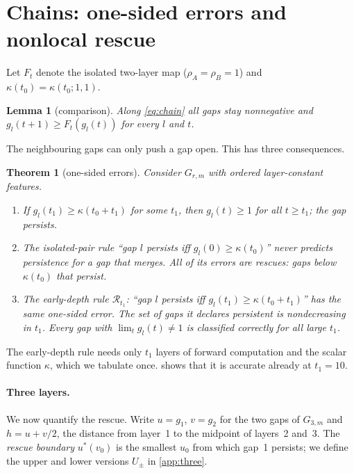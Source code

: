 \documentclass[10pt]{article}
\newtheorem{theorem}{Theorem}
\newtheorem{lemma}{Lemma}
\theoremstyle{definition}
\theoremstyle{remark}
\begin{document}
\section{Chains: one-sided errors and nonlocal rescue}\label{sec:chains}

Let $F_t$ denote the isolated two-layer map ($\rho_A=\rho_B=1$) and $\kappa(t_0)=\kappa(t_0;1,1)$.

\begin{lemma}[comparison]\label{lem:comparison}
Along \eqref{eq:chain} all gaps stay nonnegative and $g_l(t+1)\ge F_t(g_l(t))$ for every $l$ and $t$.
\end{lemma}

The neighbouring gaps can only push a gap open. This has three consequences.

\begin{theorem}[one-sided errors]\label{thm:chain}
Consider $G_{r,m}$ with ordered layer-constant features.
\begin{enumerate}[label=(\alph*),leftmargin=2em,itemsep=1pt]
\item If $g_l(t_1)\ge\kappa(t_0+t_1)$ for some $t_1$, then $g_l(t)\ge1$ for all $t\ge t_1$; the gap persists.
\item The isolated-pair rule ``gap $l$ persists iff $g_l(0)\ge\kappa(t_0)$'' never predicts persistence for a gap that merges. All of
its errors are \emph{rescues}: gaps below $\kappa(t_0)$ that persist.
\item The early-depth rule $\mathcal R_{t_1}$: ``gap $l$ persists iff $g_l(t_1)\ge\kappa(t_0+t_1)$'' has the same one-sided error. The set
of gaps it declares persistent is nondecreasing in $t_1$. Every gap with $\lim_tg_l(t)\ne1$ is classified correctly for all large $t_1$.
\end{enumerate}
\end{theorem}

The early-depth rule needs only $t_1$ layers of forward computation and the scalar function $\kappa$, which we tabulate once.
 shows that it is accurate already at $t_1=10$.

\paragraph{Three layers.} We now quantify the rescue. Write $u=g_1$, $v=g_2$ for the two gaps of $G_{3,m}$ and $h=u+v/2$, the distance
from layer~1 to the midpoint of layers~2 and~3. The \emph{rescue boundary} $u^*(v_0)$ is the smallest $u_0$ from which gap~1
persists; we define the upper and lower versions $U_\pm$ in \cref{app:three}.
\end{document}
